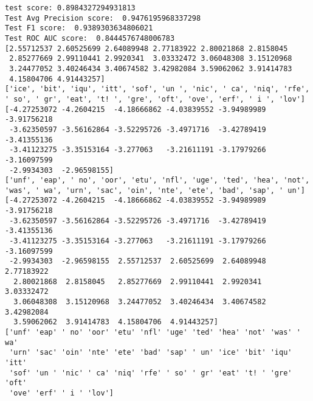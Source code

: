 \documentclass[11pt]{article}
\begin{document}
    \begin{Verbatim}[commandchars=\\\{\}]
test score: 0.8984327294931813
Test Avg Precision score:  0.9476195968337298
Test F1 score:  0.9389303634806021
Test ROC AUC score:  0.8444576748006783
[2.55712537 2.60525699 2.64089948 2.77183922 2.80021868 2.8158045
 2.85277669 2.99110441 2.9920341  3.03332472 3.06048308 3.15120968
 3.24477052 3.40246434 3.40674582 3.42982084 3.59062062 3.91414783
 4.15804706 4.91443257]
['ice', 'bit', 'iqu', 'itt', 'sof', 'un ', 'nic', ' ca', 'niq', 'rfe', ' so', ' gr', 'eat', 't! ', 'gre', 'oft', 'ove', 'erf', ' i ', 'lov']
[-4.27253072 -4.2604215  -4.18666862 -4.03839552 -3.94989989 -3.91756218
 -3.62350597 -3.56162864 -3.52295726 -3.4971716  -3.42789419 -3.41355136
 -3.41123275 -3.35153164 -3.277063   -3.21611191 -3.17979266 -3.16097599
 -2.9934303  -2.96598155]
['unf', 'eap', ' no', 'oor', 'etu', 'nfl', 'uge', 'ted', 'hea', 'not', 'was', ' wa', 'urn', 'sac', 'oin', 'nte', 'ete', 'bad', 'sap', ' un']
[-4.27253072 -4.2604215  -4.18666862 -4.03839552 -3.94989989 -3.91756218
 -3.62350597 -3.56162864 -3.52295726 -3.4971716  -3.42789419 -3.41355136
 -3.41123275 -3.35153164 -3.277063   -3.21611191 -3.17979266 -3.16097599
 -2.9934303  -2.96598155  2.55712537  2.60525699  2.64089948  2.77183922
  2.80021868  2.8158045   2.85277669  2.99110441  2.9920341   3.03332472
  3.06048308  3.15120968  3.24477052  3.40246434  3.40674582  3.42982084
  3.59062062  3.91414783  4.15804706  4.91443257]
['unf' 'eap' ' no' 'oor' 'etu' 'nfl' 'uge' 'ted' 'hea' 'not' 'was' ' wa'
 'urn' 'sac' 'oin' 'nte' 'ete' 'bad' 'sap' ' un' 'ice' 'bit' 'iqu' 'itt'
 'sof' 'un ' 'nic' ' ca' 'niq' 'rfe' ' so' ' gr' 'eat' 't! ' 'gre' 'oft'
 'ove' 'erf' ' i ' 'lov']

    \end{Verbatim}

    \begin{center}
    \end{center}
    { \hspace*{\fill} \\}
    
\end{document}
